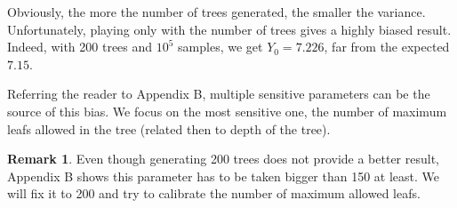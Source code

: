 \documentclass[english,11pt,openany]{report}
\theoremstyle{definition}
\theoremstyle{plain}
\theoremstyle{definition}
\newtheorem{Rem}[Th]{Remark}
\begin{document}
Obviously, the more the number of trees generated, the smaller the variance. Unfortunately, playing only with the number of trees gives a highly biased result. Indeed, with 200 trees and $10^5$ samples, we get $Y_0 = 7.226$, far from the expected $7.15$. 

Referring the reader to Appendix B, multiple sensitive parameters can be the source of this bias. 
We focus on the most sensitive one, the number of maximum leafs allowed in the tree (related then to depth of the tree). 

\begin{Rem}
	Even though generating 200 trees does not provide a better result, Appendix B shows this parameter has to be taken bigger than 150 at least. We will fix it to 200 and try to calibrate the number of maximum allowed leafs. 
\end{Rem}
\end{document}
